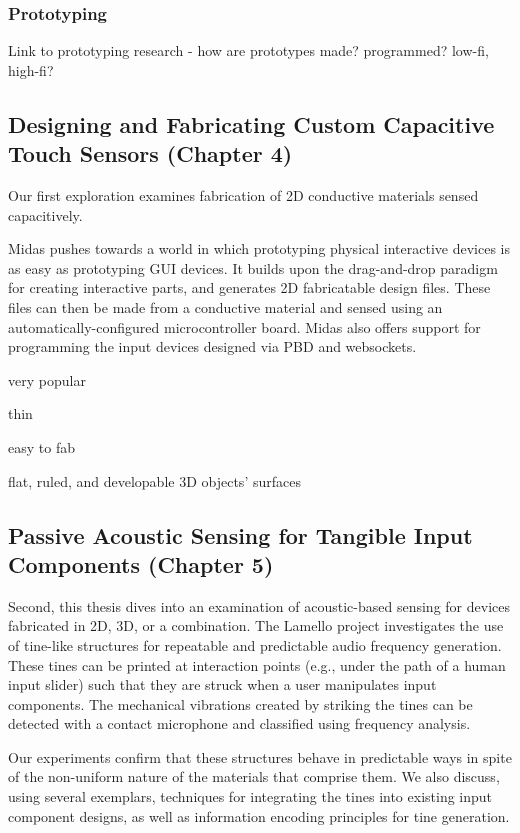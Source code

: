 \subsubsection{Prototyping}
Link to prototyping research - how are prototypes made? programmed? low-fi, high-fi?

\subsection{Designing and Fabricating Custom Capacitive Touch Sensors (Chapter 4)}


Our first exploration examines fabrication of 2D conductive materials sensed capacitively.

Midas pushes towards a world in which prototyping physical interactive devices is as easy as prototyping GUI devices. It builds upon the drag-and-drop paradigm for creating interactive parts, and generates 2D fabricatable design files. These files can then be made from a conductive material and sensed using an automatically-configured microcontroller board. Midas also offers support for programming the input devices designed via PBD and websockets.

very popular

thin

easy to fab

flat, ruled, and developable 3D objects' surfaces

\subsection{Passive Acoustic Sensing for Tangible Input Components (Chapter 5)}

Second, this thesis dives into an examination of acoustic-based sensing for devices fabricated in 2D, 3D, or a combination. The Lamello project investigates the use of tine-like structures for repeatable and predictable audio frequency generation. These tines can be printed at interaction points (e.g., under the path of a human input slider) such that they are struck when a user manipulates input components. The mechanical vibrations created by striking the tines can be detected with a contact microphone and classified using frequency analysis.

Our experiments confirm that these structures behave in predictable ways in spite of the non-uniform nature of the materials that comprise them. We also discuss, using several exemplars, techniques for integrating the tines into existing input component designs, as well as information encoding principles for tine generation.

